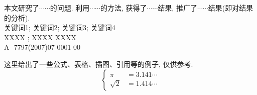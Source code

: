 \documentclass[a4paper,11pt,onecolumn,twoside]{ctexart}
\begin{document}
\date{}  %
\maketitle \vspace{-8mm}
\begin{center}
\begin{minipage}[c]{14cm}
 \mbox{}\quad
本文研究了$\cdots\cdots$的问题. 利用$\cdots\cdots$的方法,
获得了$\cdots\cdots$结果,
推广了$\cdots\cdots$结果(即对结果的分析). \\
\mbox{}\quad 关键词1; 关键词2; 关键词3; 关键词4\\
\mbox{}\quad
XXXX ; XXXX \quad \quad \quad
\mbox{}\quad
XXXX  \\
\mbox{}\quad A
\quad \quad \quad
\mbox{}-7797(2007)07-0001-00\\

\end{minipage}
\end{center}

\vskip 0mm  \vskip 3mm
\setcounter{section}{1}\setcounter{equation}{0}


\vskip 4mm  \vskip 3mm
\setcounter{section}{2}\setcounter{equation}{0}


这里给出了一些公式、表格、插图、引用等的例子, 仅供参考.
\begin{equation} \label{eq:1}
\left\{ \begin{aligned}
         \pi &= 3.141\cdots \\
     \sqrt{2}&=1.414\cdots
         \end{aligned} \right.
\end{equation}
\end{document}
